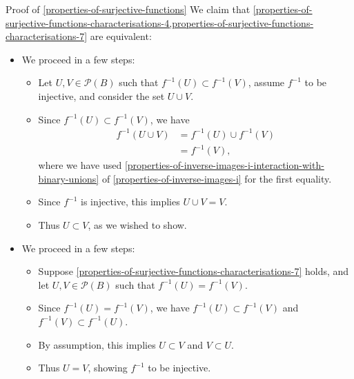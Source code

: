 \begin{Proof}{Proof of \cref{properties-of-surjective-functions}}
    We claim that \cref{properties-of-surjective-functions-characterisations-4,properties-of-surjective-functions-characterisations-7} are equivalent:
    \begin{itemize}
        \item{}We proceed in a few steps:
            \begin{itemize}
                \item Let $U,V\in\mathcal{P}(B)$ such that $f^{-1}(U)\subset f^{-1}(V)$, assume $f^{-1}$ to be injective, and consider the set $U\cup V$.
                \item Since $f^{-1}(U)\subset f^{-1}(V)$, we have
                    \begin{align*}
                        f^{-1}(U\cup V) &= f^{-1}(U)\cup f^{-1}(V)\\
                                        &= f^{-1}(V),
                    \end{align*}
                    where we have used \cref{properties-of-inverse-images-i-interaction-with-binary-unions} of \cref{properties-of-inverse-images-i} for the first equality.
                \item Since $f^{-1}$ is injective, this implies $U\cup V=V$.
                \item Thus $U\subset V$, as we wished to show.
            \end{itemize}
        \item{}We proceed in a few steps:
            \begin{itemize}
                \item Suppose \cref{properties-of-surjective-functions-characterisations-7} holds, and let $U,V\in\mathcal{P}(B)$ such that $f^{-1}(U)=f^{-1}(V)$.
                \item Since $f^{-1}(U)=f^{-1}(V)$, we have $f^{-1}(U)\subset f^{-1}(V)$ and $f^{-1}(V)\subset f^{-1}(U)$.
                \item By assumption, this implies $U\subset V$ and $V\subset U$.
                \item Thus $U=V$, showing $f^{-1}$ to be injective.
            \end{itemize}
    \end{itemize}


\end{Proof}
